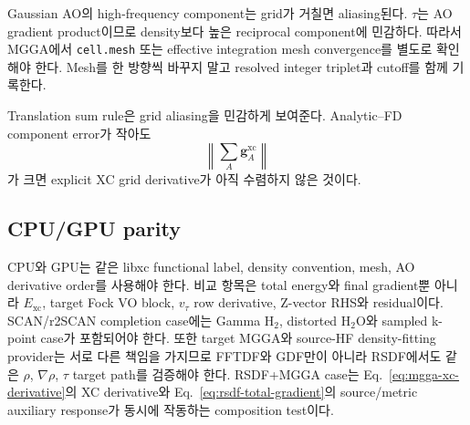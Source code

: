 Gaussian AO의 high-frequency component는 grid가 거칠면 aliasing된다. $\tau$는 AO
gradient product이므로 density보다 높은 reciprocal component에 민감하다. 따라서
MGGA에서 \texttt{cell.mesh} 또는 effective integration mesh convergence를 별도로 확인해야
한다. Mesh를 한 방향씩 바꾸지 말고 resolved integer triplet과 cutoff를 함께 기록한다.

Translation sum rule은 grid aliasing을 민감하게 보여준다. Analytic--FD component error가
작아도
\begin{equation}
  \left\|\sum_A\mathbf g_A^{\mathrm{xc}}\right\|
  \label{eq:mgga-xc-translation}
\end{equation}
가 크면 explicit XC grid derivative가 아직 수렴하지 않은 것이다.

\subsection{CPU/GPU parity}

CPU와 GPU는 같은 libxc functional label, density convention, mesh, AO derivative order를
사용해야 한다. 비교 항목은 total energy와 final gradient뿐 아니라
$E_{\mathrm{xc}}$, target Fock VO block, $v_\tau$ row derivative, Z-vector RHS와 residual이다.
SCAN/r2SCAN completion case에는 Gamma H$_2$, distorted H$_2$O와 sampled k-point case가
포함되어야 한다. 또한 target MGGA와 source-HF density-fitting provider는 서로 다른
책임을 가지므로 FFTDF와 GDF만이 아니라 RSDF에서도 같은 $\rho$, $\nabla\rho$, $\tau$
target path를 검증해야 한다. RSDF+MGGA case는 Eq.~\eqref{eq:mgga-xc-derivative}의
XC derivative와 Eq.~\eqref{eq:rsdf-total-gradient}의 source/metric auxiliary response가
동시에 작동하는 composition test이다.
